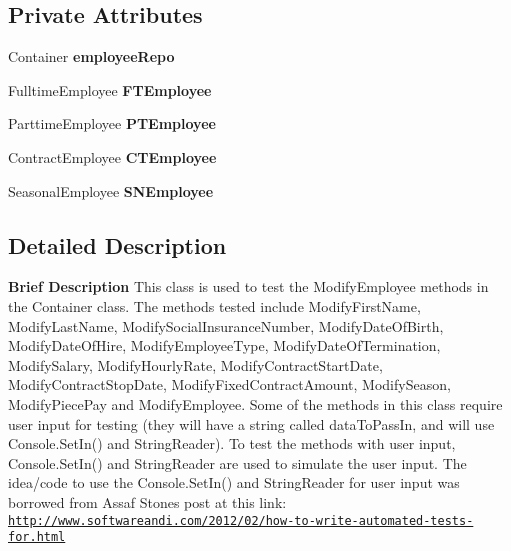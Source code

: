 \subsection*{Private Attributes}
\begin{DoxyCompactItemize}
\item 
\hypertarget{class_the_company_1_1_tests_1_1_modify_employee_tests_a3417363b3c78fe9e1cab893b0fcaf862}{}Container {\bfseries employee\+Repo}\label{class_the_company_1_1_tests_1_1_modify_employee_tests_a3417363b3c78fe9e1cab893b0fcaf862}

\item 
\hypertarget{class_the_company_1_1_tests_1_1_modify_employee_tests_acd7940e13865957d44d7066aa4a1aaeb}{}Fulltime\+Employee {\bfseries F\+T\+Employee}\label{class_the_company_1_1_tests_1_1_modify_employee_tests_acd7940e13865957d44d7066aa4a1aaeb}

\item 
\hypertarget{class_the_company_1_1_tests_1_1_modify_employee_tests_ae7a47e44efd724406acac92d59ed398e}{}Parttime\+Employee {\bfseries P\+T\+Employee}\label{class_the_company_1_1_tests_1_1_modify_employee_tests_ae7a47e44efd724406acac92d59ed398e}

\item 
\hypertarget{class_the_company_1_1_tests_1_1_modify_employee_tests_af2e976921fe919a5d3c3a9fbdbaa7b5e}{}Contract\+Employee {\bfseries C\+T\+Employee}\label{class_the_company_1_1_tests_1_1_modify_employee_tests_af2e976921fe919a5d3c3a9fbdbaa7b5e}

\item 
\hypertarget{class_the_company_1_1_tests_1_1_modify_employee_tests_a145bcc87c5babde1b9132d4ea1a41758}{}Seasonal\+Employee {\bfseries S\+N\+Employee}\label{class_the_company_1_1_tests_1_1_modify_employee_tests_a145bcc87c5babde1b9132d4ea1a41758}

\end{DoxyCompactItemize}


\subsection{Detailed Description}
{\bfseries  Brief Description} This class is used to test the Modify\+Employee methods in the Container class. The methods tested include Modify\+First\+Name, Modify\+Last\+Name, Modify\+Social\+Insurance\+Number, Modify\+Date\+Of\+Birth, Modify\+Date\+Of\+Hire, Modify\+Employee\+Type, Modify\+Date\+Of\+Termination, Modify\+Salary, Modify\+Hourly\+Rate, Modify\+Contract\+Start\+Date, Modify\+Contract\+Stop\+Date, Modify\+Fixed\+Contract\+Amount, Modify\+Season, Modify\+Piece\+Pay and Modify\+Employee. Some of the methods in this class require user input for testing (they will have a string called data\+To\+Pass\+In, and will use Console.\+Set\+In() and String\+Reader). To test the methods with user input, Console.\+Set\+In() and String\+Reader are used to simulate the user input. The idea/code to use the Console.\+Set\+In() and String\+Reader for user input was borrowed from Assaf Stone\textquotesingle{}s post at this link\+: \href{http://www.softwareandi.com/2012/02/how-to-write-automated-tests-for.html}{\tt http\+://www.\+softwareandi.\+com/2012/02/how-\/to-\/write-\/automated-\/tests-\/for.\+html} 

